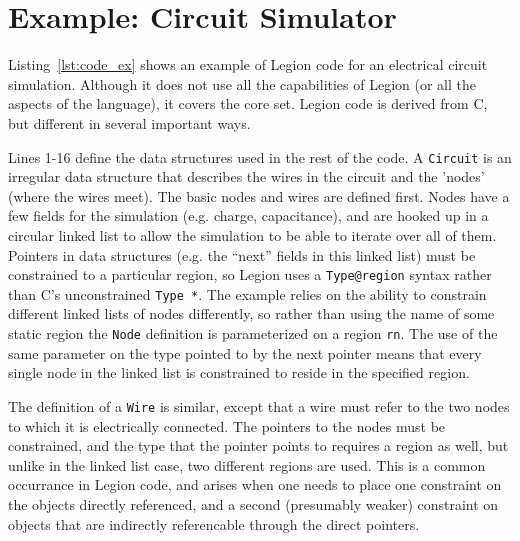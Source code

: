 \section{Example: Circuit Simulator}
\label{sec:ex}

%

Listing~\ref{lst:code_ex} shows an example of Legion code for an electrical
circuit simulation.  Although it does not use all the capabilities of Legion
(or all the aspects of the language), it covers the core set.  Legion code is
derived from C, but different in several important ways.

Lines 1-16 
define the data structures used in the rest of the code.  A {\tt Circuit}
is an irregular data structure that describes the wires in the circuit and
the 'nodes' (where the wires meet).  The basic nodes and wires are defined
first.  Nodes have a few fields for the simulation (e.g. charge, capacitance),
and are hooked up in a circular linked list to allow the simulation to be
able to iterate over all of them.  Pointers in data structures (e.g. the
``next'' fields in this linked list) must be constrained
to a particular region, so Legion uses a {\tt Type@region} syntax rather than
C's unconstrained {\tt Type~*}.  The example relies on the ability to
constrain different linked lists of nodes differently, so rather than using
the name of some static region the {\tt Node} definition is parameterized on
a region {\tt rn}.  The use of the same parameter on the type pointed to by
the next pointer means that every single node in the linked list is constrained
to reside in the specified region.

The definition of a {\tt Wire} is similar, except that a wire must refer to
the two nodes to which it is electrically connected.  The pointers to the nodes
must be constrained, and the type that the pointer points to requires a region
as well, but unlike in the linked list case, two different regions are used.
This is a common occurrance in Legion code, and arises when one needs to place
one constraint on the objects directly referenced, and a second (presumably
weaker) constraint on objects that are indirectly referencable through the
direct pointers.


